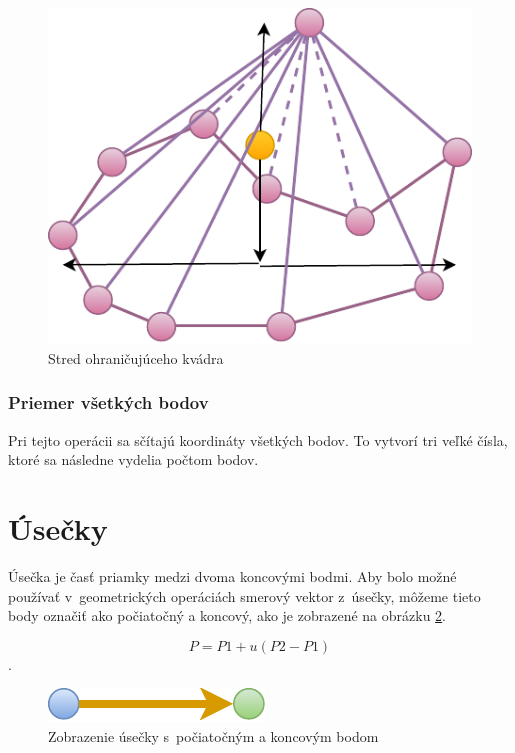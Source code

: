 \begin{figure}[H]
	\centering
	\includegraphics[height=0.3\textwidth]{obrazky-figures/Diagram/Draw/1Points/DP Navrh operacii-0D - PointMiddle of 3D object.pdf}
	\caption{Stred ohraničujúceho kvádra}
	\label{fig:PointMiddle of 3D object}
\end{figure}

\subsubsection{Priemer všetkých bodov} 
Pri tejto operácii sa sčítajú koordináty všetkých bodov. To vytvorí tri veľké čísla, ktoré sa následne vydelia počtom bodov.










\section{Úsečky}
Úsečka je časť priamky medzi dvoma koncovými bodmi. Aby bolo možné používať v~geometrických operáciách smerový vektor z~úsečky, môžeme tieto body označiť ako počiatočný a koncový, ako je zobrazené na obrázku \ref{fig:Navrh operacii-1D - Line}. 

\begin{equation}
    P = P1 + u(P2-P1)
    \label{eq:priamka}
\end{equation}. 

\begin{figure}[H]
	\centering
	\includegraphics[]{obrazky-figures/Diagram/Draw/2Line/DP Navrh operacii-1D - Line.pdf}
	\caption{Zobrazenie úsečky s~počiatočným a koncovým bodom}
	\label{fig:Navrh operacii-1D - Line}
\end{figure}


